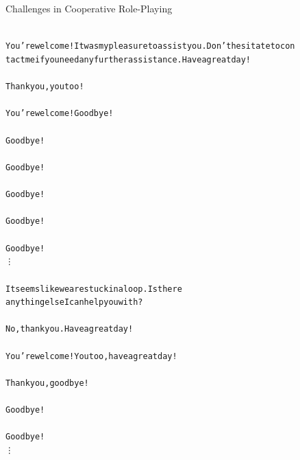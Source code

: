 \begin{figure}[h]
\begin{AIBox}{Challenges in Cooperative Role-Playing}
{\begin{alltt}
				\assistantmsg \\ You're welcome! It was my pleasure to assist you. Don't hesitate to contact me if you need any further assistance. Have a great day!\\

				\usermsg \\Thank you, you too!\\

				\assistantmsg\\  You're welcome! Goodbye!\\

				\usermsg\\ Goodbye!\\

				\assistantmsg\\ Goodbye!\\

				\usermsg\\  Goodbye!\\

				\assistantmsg\\ Goodbye!\\

				\usermsg\\  Goodbye!\\

				\hspace{3cm}\vdots\\


				\assistantmsg\\  It seems like we are stuck in a loop. Is there \\[4pt]anything else I can help you with?\\

				\usermsg\\  No, thank you. Have a great day!\\

				\assistantmsg\\  You're welcome! You too, have a great day!\\

				\usermsg\\ Thank you, goodbye!\\

				\assistantmsg\\  Goodbye!\\

				\usermsg\\ Goodbye!\\

				\hspace{3cm}\vdots\\


\end{alltt}}
\end{AIBox}
\end{figure}
